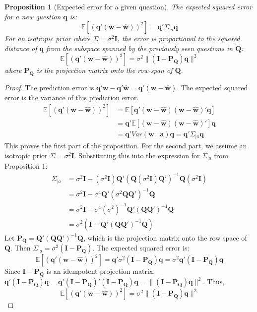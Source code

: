 \documentclass[\ifdraft draft\fi]{article}
\newtheorem{proposition}{Proposition}
\begin{document}
\begin{proposition}[Expected error for a given question]
The expected squared error for a new question $\bm q$ is:
  \[ \mathbb{E}[(\bm q'(\bm w - \hat{\bm w}))^2] = \bm q' \Sigma_{\mid a} \bm q \]
  For an isotropic prior where $\Sigma = \sigma^2 \bm{I}$, the error is proportional to the squared distance of $\bm q$ from the subspace spanned by the previously seen questions in $\bm{Q}$:
  \[ \mathbb{E}[(\bm q'(\bm w - \hat{\bm w}))^2] = \sigma^2 \|(\bm{I}-\bm{P_Q})\bm q\|^2 \]
  where $\bm{P_Q}$ is the projection matrix onto the row-span of $\bm{Q}$.
\end{proposition}
\begin{greyproof}
\begin{proof}
The prediction error is $\bm{q}'\bm{w} - \bm{q}'\hat{\bm{w}} = \bm{q}'(\bm{w} - \hat{\bm{w}})$. The expected squared error is the variance of this prediction error.
\[
\begin{aligned}
\mathbb{E}[(\bm q'(\bm w - \hat{\bm w}))^2] &= \mathbb{E}[\bm q'(\bm w - \hat{\bm w})(\bm w - \hat{\bm w})'\bm q] \\
&= \bm q' \mathbb{E}[(\bm w - \hat{\bm w})(\bm w - \hat{\bm w})'] \bm q \\
&= \bm q' Var(\bm w \mid \bm a) \bm q = \bm q' \Sigma_{\mid a} \bm q
\end{aligned}
\]
This proves the first part of the proposition. For the second part, we assume an isotropic prior $\Sigma = \sigma^2\bm{I}$. Substituting this into the expression for $\Sigma_{\mid a}$ from Proposition 1:
\[
\begin{aligned}
\Sigma_{\mid a} &= \sigma^2\bm{I} - (\sigma^2\bm{I})\bm{Q}'(\bm{Q}(\sigma^2\bm{I})\bm{Q}')^{-1}\bm{Q}(\sigma^2\bm{I}) \\
&= \sigma^2\bm{I} - \sigma^4 \bm{Q}'(\sigma^2\bm{Q}\bm{Q}')^{-1}\bm{Q} \\
&= \sigma^2\bm{I} - \sigma^4 (\sigma^2)^{-1} \bm{Q}'(\bm{Q}\bm{Q}')^{-1}\bm{Q} \\
&= \sigma^2(\bm{I} - \bm{Q}'(\bm{Q}\bm{Q}')^{-1}\bm{Q})
\end{aligned}
\]
Let $\bm{P_Q} = \bm{Q}'(\bm{Q}\bm{Q}')^{-1}\bm{Q}$, which is the projection matrix onto the row space of $\bm{Q}$. Then $\Sigma_{\mid a} = \sigma^2(\bm{I} - \bm{P_Q})$. The expected squared error is:
\[
\mathbb{E}[(\bm q'(\bm w - \hat{\bm w}))^2] = \bm q' \sigma^2(\bm{I} - \bm{P_Q}) \bm q = \sigma^2 \bm q'(\bm{I} - \bm{P_Q})\bm q
\]
Since $\bm{I} - \bm{P_Q}$ is an idempotent projection matrix, $\bm q'(\bm{I} - \bm{P_Q})\bm q = \bm q'(\bm{I} - \bm{P_Q})'(\bm{I} - \bm{P_Q})\bm q = \|(\bm{I} - \bm{P_Q})\bm q\|^2$. Thus,
\[
\mathbb{E}[(\bm q'(\bm w - \hat{\bm w}))^2] = \sigma^2 \|(\bm{I}-\bm{P_Q})\bm q\|^2
\]
\end{proof}
\end{greyproof}
\end{document}
